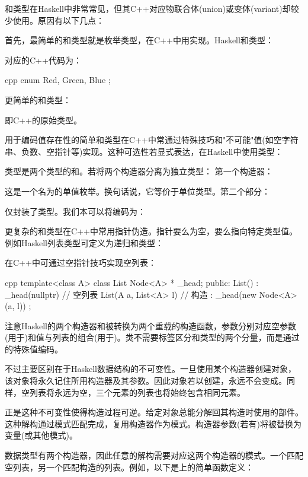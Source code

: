 和类型在Haskell中非常常见，但其C++对应物联合体(union)或变体(variant)却较少使用。原因有以下几点：

首先，最简单的和类型就是枚举类型，在C++中用实现。Haskell和类型：

对应的C++代码为：

\begin{snip}{cpp}
enum { Red, Green, Blue };
\end{snip}
更简单的和类型：

即C++的原始类型。

用于编码值存在性的简单和类型在C++中常通过特殊技巧和"不可能"值(如空字符串、负数、空指针等)实现。这种可选性若显式表达，在Haskell中使用类型：

类型是两个类型的和。若将两个构造器分离为独立类型：
第一个构造器：

这是一个名为的单值枚举。换句话说，它等价于单位类型\code{()}。第二个部分：

仅封装了类型。我们本可以将编码为：

更复杂的和类型在C++中常用指针伪造。指针要么为空，要么指向特定类型值。例如Haskell列表类型可定义为递归和类型：

在C++中可通过空指针技巧实现空列表：

\begin{snip}{cpp}
template<class A>
class List { 
    Node<A> * _head;
public:
    List() : _head(nullptr) {} // 空列表
    List(A a, List<A> l)       // 构造
      : _head(new Node<A>(a, l))
    {}
};
\end{snip}
注意Haskell的两个构造器和被转换为两个重载的构造函数，参数分别对应空参数(用于)和值与列表的组合(用于)。类不需要标签区分和类型的两个分量，而是通过的特殊值编码。

不过主要区别在于Haskell数据结构的不可变性。一旦使用某个构造器创建对象，该对象将永久记住所用构造器及其参数。因此对象若以创建，永远不会变成。同样，空列表将永远为空，三个元素的列表也将始终包含相同元素。

正是这种不可变性使得构造过程可逆。给定对象总能分解回其构造时使用的部件。这种解构通过模式匹配完成，复用构造器作为模式。构造器参数(若有)将被替换为变量(或其他模式)。

数据类型有两个构造器，因此任意的解构需要对应这两个构造器的模式。一个匹配空列表，另一个匹配构造的列表。例如，以下是上的简单函数定义：

